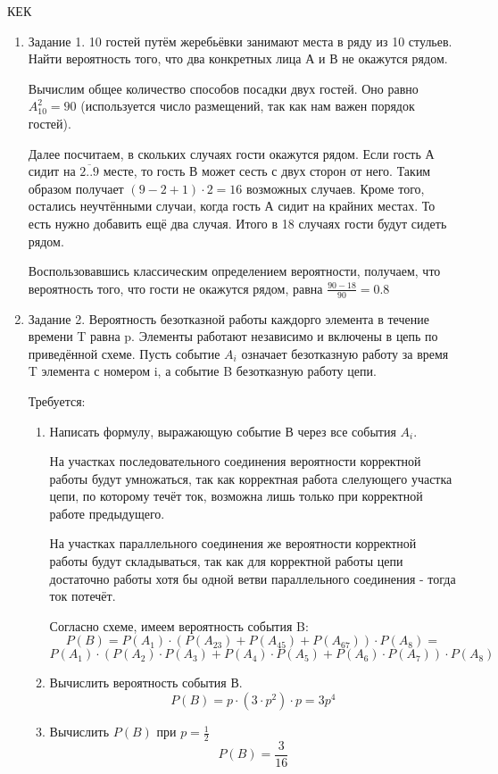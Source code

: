 

КЕК
\begin{enumerate}
\item{Задание 1.}
10 гостей путём жеребьёвки занимают места в ряду из 10 стульев. Найти вероятность того, что два конкретных лица А и В не окажутся рядом.

Вычислим общее количество способов посадки двух гостей. Оно равно $ A_{10}^2 = 90 $ (используется число размещений, так как нам важен порядок
гостей).

Далее посчитаем, в скольких случаях гости окажутся рядом. Если гость А сидит на $\overline{2..9}$ месте, то гость В может сесть с двух сторон от него. Таким образом получает $(9 - 2 + 1) \cdot 2 = 16$ возможных случаев. Кроме того, остались неучтёнными случаи, когда гость А сидит на крайних местах. То есть нужно добавить ещё два случая. Итого в 18 случаях гости будут сидеть рядом.

Воспользовавшись классическим определением вероятности, получаем, что вероятность того, что гости не окажутся рядом, равна $\frac{90-18}{90}=0.8$

\item{Задание 2}. Вероятность безотказной работы каждорго элемента в течение времени T равна p. Элементы работают независимо и включены в цепь по приведённой схеме. Пусть событие $A_i$ означает безотказную работу за время T элемента с номером i, а событие B безотказную работу цепи.

Требуется:
\begin{enumerate}
\item{} Написать формулу, выражающую событие В через все события $A_i$.

На участках последовательного соединения вероятности корректной работы будут умножаться, так как корректная работа слелующего участка цепи, по которому течёт ток, возможна лишь только при корректной работе предыдущего.

На участках параллельного соединения же вероятности корректной работы будут складываться, так как для корректной работы цепи достаточно работы хотя бы одной ветви параллельного соединения - тогда ток потечёт.

Согласно схеме, имеем вероятность события B:
$$P(B) = P(A_1) \cdot (P(A_{23}) + P(A_{45}) + P(A_{67})) \cdot P(A_8) = $$
$$P(A_1) \cdot (P(A_2) \cdot P(A_3) + P(A_4) \cdot P(A_5) + P(A_6) \cdot P(A_7)) \cdot P(A_8)$$

\item{} Вычислить вероятность события В.
$$P(B) = p \cdot (3\cdot p^2) \cdot p = 3p^4$$
\item{} Вычислить $P(B)$ при $p=\frac{1}{2}$
$$P(B) = \frac{3}{16}$$
\end{enumerate}


\end{enumerate}
